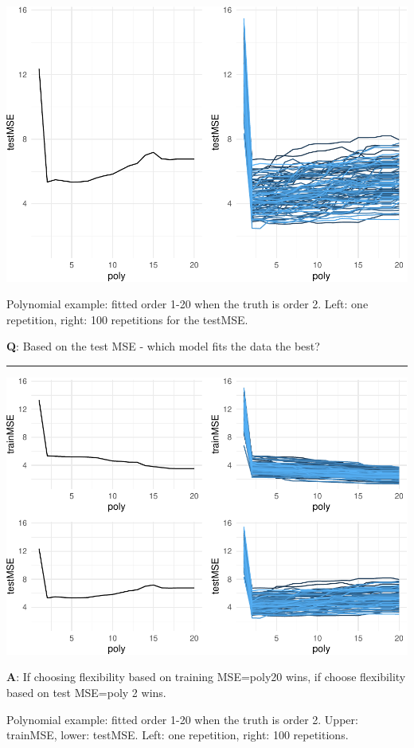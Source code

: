 \documentclass[]{article}
\begin{document}
\includegraphics{2StatLearn_files/figure-latex/traintestMSE-1.pdf}

Polynomial example: fitted order 1-20 when the truth is order 2. Left:
one repetition, right: 100 repetitions for the testMSE.

\textbf{Q}: Based on the test MSE - which model fits the data the best?

\begin{center}\rule{0.5\linewidth}{\linethickness}\end{center}

\includegraphics{2StatLearn_files/figure-latex/unnamed-chunk-1-1.pdf}

\textbf{A}: If choosing flexibility based on training MSE=poly20 wins,
if choose flexibility based on test MSE=poly 2 wins.

Polynomial example: fitted order 1-20 when the truth is order 2. Upper:
trainMSE, lower: testMSE. Left: one repetition, right: 100 repetitions.
\end{document}
